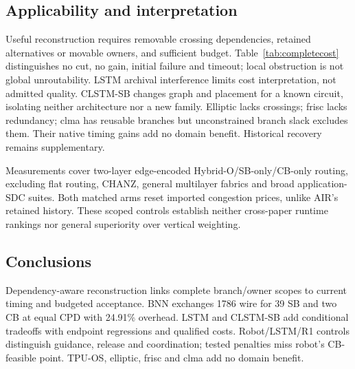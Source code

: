 \documentclass[conference,10pt]{IEEEtran}
\begin{document}
\subsection{Applicability and interpretation}
Useful reconstruction requires removable crossing dependencies, retained alternatives or movable owners, and sufficient budget. Table~\ref{tab:completecost} distinguishes no cut, no gain, initial failure and timeout; local obstruction is not global unroutability. LSTM archival interference limits cost interpretation, not admitted quality. CLSTM-SB changes graph and placement for a known circuit, isolating neither architecture nor a new family. Elliptic lacks crossings; frisc lacks redundancy; clma has reusable branches but unconstrained branch slack excludes them. Their native timing gains add no domain benefit. Historical recovery remains supplementary.

Measurements cover two-layer edge-encoded Hybrid-O/SB-only/CB-only routing, excluding flat routing, CHANZ, general multilayer fabrics and broad application-SDC suites. Both matched arms reset imported congestion prices, unlike AIR's retained history. These scoped controls establish neither cross-paper runtime rankings nor general superiority over vertical weighting.

\subsection{Conclusions}
Dependency-aware reconstruction links complete branch/owner scopes to current timing and budgeted acceptance. BNN exchanges 1786 wire for 39 SB and two CB at equal CPD with 24.91\% overhead. LSTM and CLSTM-SB add conditional tradeoffs with endpoint regressions and qualified costs. Robot/LSTM/R1 controls distinguish guidance, release and coordination; tested penalties miss robot's CB-feasible point. TPU-OS, elliptic, frisc and clma add no domain benefit.


\end{document}
